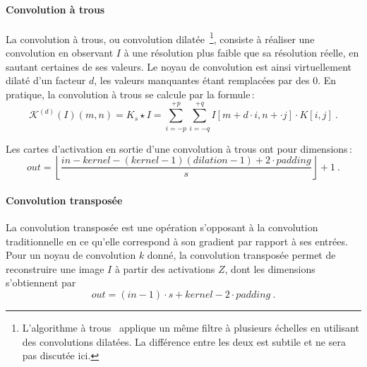 \paragraph{Convolution à trous}

La convolution à trous, ou convolution dilatée~\cite{yu_multi-scale_2015}\footnote{L'algorithme à trous~\cite{shensa_discrete_1992} applique un même filtre à plusieurs échelles en utilisant des convolutions dilatées. La différence entre les deux est subtile et ne sera pas discutée ici.}, consiste à réaliser une convolution en observant $I$ à une résolution plus faible que sa résolution réelle, en sautant certaines de ses valeurs. Le noyau de convolution est ainsi virtuellement dilaté d'un facteur $d$, les valeurs manquantes étant remplacées par des 0. En pratique, la convolution à trous se calcule par la formule\,:
\begin{equation}
\mathcal{K}^{(d)}(I)(m,n) = K_s \star I = \sum_{i=-p}^{+p} \sum_{i=-q}^{+q} I[m + d \cdot i, n + \cdot j] \cdot K[i, j]~.
\end{equation}

Les cartes d'activation en sortie d'une convolution à trous ont pour dimensions\,:
\begin{equation}\mathit{out} = \left\lfloor \frac{\mathit{in} - \mathit{kernel} - (\mathit{kernel} -1)(\mathit{dilation} - 1) + 2 \cdot \mathit{padding}}{\mathit{s}}\right\rfloor + 1~.
\end{equation}


\paragraph{Convolution transposée}

La convolution transposée est une opération s'opposant à la convolution traditionnelle en ce qu'elle correspond à son gradient par rapport à ses entrées. Pour un noyau de convolution $k$ donné, la convolution transposée permet de reconstruire une image $I$ à partir des activations $Z$, dont les dimensions s'obtiennent par
\begin{equation}
\mathit{out} = (\mathit{in} - 1) \cdot \mathit{s} + \mathit{kernel} - 2 \cdot \mathit{padding}~.
\end{equation}

